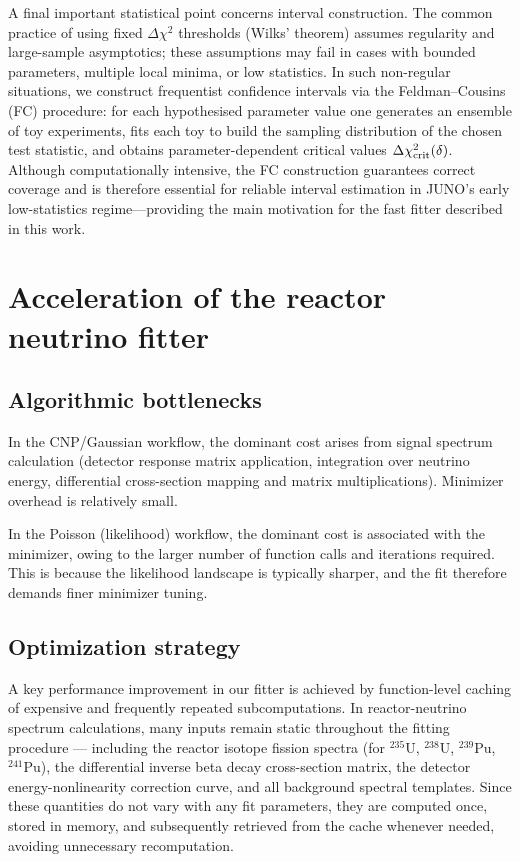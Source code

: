 \documentclass[a4paper,11pt]{article}
\begin{document}
A final important statistical point concerns interval construction. The common practice of using fixed $\Delta\chi^2$ thresholds (Wilks' theorem) assumes regularity and large-sample asymptotics; these assumptions may fail in cases with bounded parameters, multiple local minima, or low statistics. In such non-regular situations, we construct frequentist confidence intervals via the Feldman–Cousins (FC) procedure: for each hypothesised parameter value one generates an ensemble of toy experiments, fits each toy to build the sampling distribution of the chosen test statistic, and obtains parameter-dependent critical values $\Delta\chi^2_{\rm crit}(\delta)$. Although computationally intensive, the FC construction guarantees correct coverage and is therefore essential for reliable interval estimation in JUNO's early low-statistics regime—providing the main motivation for the fast fitter described in this work.

\section{Acceleration of the reactor neutrino fitter}
\subsection{Algorithmic bottlenecks}
In the CNP/Gaussian workflow, the dominant cost arises from signal spectrum calculation (detector response matrix application, integration over neutrino energy, differential cross-section mapping and matrix multiplications). Minimizer overhead is relatively small.
    
In the Poisson (likelihood) workflow, the dominant cost is associated with the minimizer, owing to the larger number of function calls and iterations required. This is because the likelihood landscape is typically sharper, and the fit therefore demands finer minimizer tuning.
\subsection{Optimization strategy}
A key performance improvement in our fitter is achieved by function-level caching of expensive and frequently repeated subcomputations. In reactor-neutrino spectrum calculations, many inputs remain static throughout the fitting procedure — including the reactor isotope fission spectra (for $^{235}\mathrm{U}$, $^{238}\mathrm{U}$, $^{239}\mathrm{Pu}$, $^{241}\mathrm{Pu}$), the differential inverse beta decay cross-section matrix, the detector energy-nonlinearity correction curve, and all background spectral templates. Since these quantities do not vary with any fit parameters, they are computed once, stored in memory, and subsequently retrieved from the cache whenever needed, avoiding unnecessary recomputation.
\end{document}
